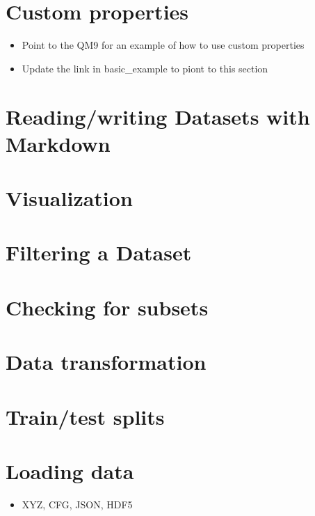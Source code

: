 \documentclass[letterpaper,10pt,english]{sphinxmanual}
\begin{document}
\section{Custom properties}
\label{\detokenize{usage:custom-properties}}\begin{itemize}
\item {} 
\sphinxAtStartPar
Point to the QM9 for an example of how to use custom properties

\item {} 
\sphinxAtStartPar
Update the link in basic\_example to piont to this section

\end{itemize}


\section{Reading/writing Datasets with Markdown}
\label{\detokenize{usage:reading-writing-datasets-with-markdown}}

\section{Visualization}
\label{\detokenize{usage:visualization}}

\section{Filtering a Dataset}
\label{\detokenize{usage:filtering-a-dataset}}

\section{Checking for subsets}
\label{\detokenize{usage:checking-for-subsets}}

\section{Data transformation}
\label{\detokenize{usage:data-transformation}}

\section{Train/test splits}
\label{\detokenize{usage:train-test-splits}}

\section{Loading data}
\label{\detokenize{usage:loading-data}}\begin{itemize}
\item {} 
\sphinxAtStartPar
XYZ, CFG, JSON, HDF5

\end{itemize}
\end{document}
